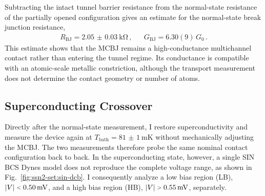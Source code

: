     Subtracting the intact tunnel barrier resistance from the normal-state resistance of the partially opened configuration gives an estimate for the normal-state break junction resistance,
    \begin{align}
        R_\mathrm{BJ} = \qty{2.05(3)}{\kilo\ohm}\,, &&
        G_\mathrm{BJ} = 6.30(9)\,G_0\,.
        \label{eq:ssn-set:dynamic:break-junction-normal}
    \end{align}
    This estimate shows that the MCBJ remains a high-conductance multichannel contact rather than entering the tunnel regime. Its conductance is compatible with an atomic-scale metallic constriction, although the transport measurement does not determine the contact geometry or number of atoms.


    \subsection*{Superconducting Crossover}

    Directly after the normal-state measurement, I restore superconductivity and measure the device again at $T_\mathrm{bath}=\qty{81(1)}{\milli\kelvin}$ without mechanically adjusting the MCBJ. The two measurements therefore probe the same nominal contact configuration back to back. In the superconducting state, however, a single SIN BCS Dynes model does not reproduce the complete voltage range, as shown in Fig.~\ref{fig:ssn2-set:sin-dcb}. I consequently analyze a low bias region (LB), $\lvert V\rvert\slt{}\qty{0.50}{\milli\volt}$, and a high bias region (HB), $\lvert V\rvert\sgt{}\qty{0.55}{\milli\volt}$, separately.


